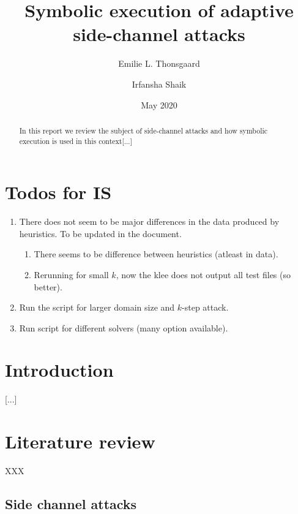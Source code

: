 \documentclass[11pt,a4paper,notitlepage]{article}
\title{Symbolic execution of adaptive side-channel attacks}
\author{Emilie L. Thonsgaard \and Irfansha Shaik}
\date{May 2020}
\begin{document}
\begin{titlingpage}
    \maketitle
    \begin{abstract}
        In this report we review the subject of side-channel attacks and how symbolic execution is used in this context[...]
    \end{abstract}
\end{titlingpage}

\tableofcontents
\newpage
\setcounter{section}{-1}


\section{Todos for IS}
\label{sec:todosforis}

\begin{enumerate}
  \item There does not seem to be major differences in the data produced by heuristics. To be updated in the document.
  \begin{enumerate}
    \item There seems to be difference between heuristics (atleast in data).
    \item Rerunning for small $k$, now the klee does not output all test files (so better).
  \end{enumerate}
  \item Run the script for larger domain size and $k$-step attack.
  \item Run script for different solvers (many option available).
\end{enumerate}

\newpage

\section{Introduction}
\label{cha:introduction}

[...]

\newpage

\section{Literature review}
\label{cha:literaturereview}

XXX

\subsection{Side channel attacks}
\label{sec:sidechannelattacks}
\end{document}
